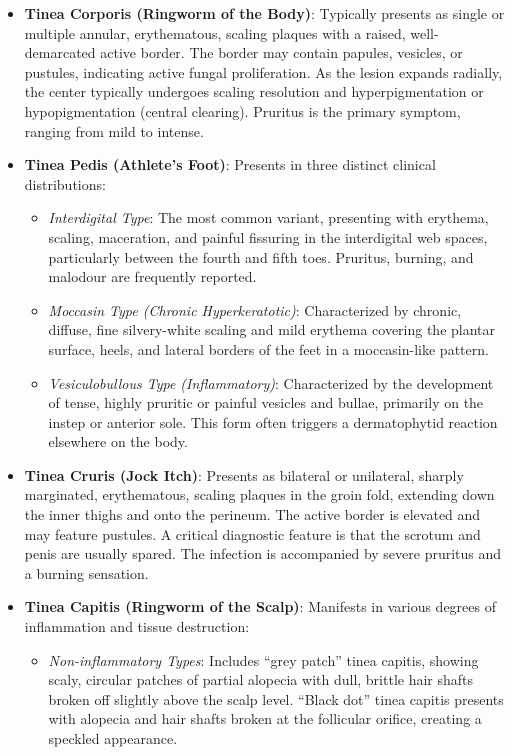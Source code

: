 \begin{itemize}
    \item \textbf{Tinea Corporis (Ringworm of the Body)}: Typically presents as single or multiple annular, erythematous, scaling plaques with a raised, well-demarcated active border. The border may contain papules, vesicles, or pustules, indicating active fungal proliferation. As the lesion expands radially, the center typically undergoes scaling resolution and hyperpigmentation or hypopigmentation (central clearing). Pruritus is the primary symptom, ranging from mild to intense.
    \item \textbf{Tinea Pedis (Athlete's Foot)}: Presents in three distinct clinical distributions:
    \begin{itemize}
        \item \textit{Interdigital Type}: The most common variant, presenting with erythema, scaling, maceration, and painful fissuring in the interdigital web spaces, particularly between the fourth and fifth toes. Pruritus, burning, and malodour are frequently reported.
        \item \textit{Moccasin Type (Chronic Hyperkeratotic)}: Characterized by chronic, diffuse, fine silvery-white scaling and mild erythema covering the plantar surface, heels, and lateral borders of the feet in a moccasin-like pattern.
        \item \textit{Vesiculobullous Type (Inflammatory)}: Characterized by the development of tense, highly pruritic or painful vesicles and bullae, primarily on the instep or anterior sole. This form often triggers a dermatophytid reaction elsewhere on the body.
    \end{itemize}
    \item \textbf{Tinea Cruris (Jock Itch)}: Presents as bilateral or unilateral, sharply marginated, erythematous, scaling plaques in the groin fold, extending down the inner thighs and onto the perineum. The active border is elevated and may feature pustules. A critical diagnostic feature is that the scrotum and penis are usually spared. The infection is accompanied by severe pruritus and a burning sensation.
    \item \textbf{Tinea Capitis (Ringworm of the Scalp)}: Manifests in various degrees of inflammation and tissue destruction:
    \begin{itemize}
        \item \textit{Non-inflammatory Types}: Includes ``grey patch'' tinea capitis, showing scaly, circular patches of partial alopecia with dull, brittle hair shafts broken off slightly above the scalp level. ``Black dot'' tinea capitis presents with alopecia and hair shafts broken at the follicular orifice, creating a speckled appearance.

\end{itemize}
\end{itemize}
